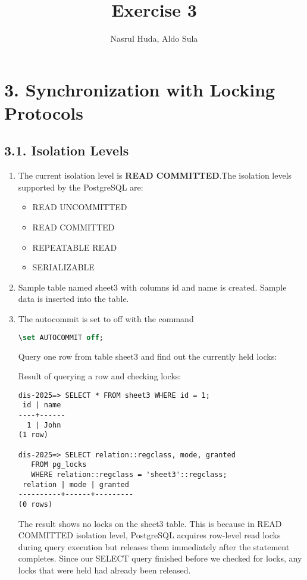 \documentclass{article}
\begin{document}
    \title{Exercise 3}
    \author{Nasrul Huda, Aldo Sula}
    \maketitle

    \section{3. Synchronization with Locking Protocols}
    \subsection{3.1. Isolation Levels}
    \begin{enumerate}[label=\alph*)]
        \item The current isolation level is \textbf{READ COMMITTED}.The isolation levels supported by the PostgreSQL are:
        \begin{itemize}
            \item READ UNCOMMITTED
            \item READ COMMITTED
            \item REPEATABLE READ
            \item SERIALIZABLE
        \end{itemize}

        \item Sample table named sheet3 with columns id and name is created. Sample data is inserted into the table.
        
        \item The autocommit is set to off with the command \begin{lstlisting}[language=sql]
            \set AUTOCOMMIT off;
        \end{lstlisting}

        Query one row from table sheet3 and find out the currently held locks: 
        
        Result of querying a row and checking locks:
        \begin{lstlisting}
dis-2025=> SELECT * FROM sheet3 WHERE id = 1;
 id | name 
----+------
  1 | John
(1 row)

dis-2025=> SELECT relation::regclass, mode, granted
   FROM pg_locks
   WHERE relation::regclass = 'sheet3'::regclass;
 relation | mode | granted 
----------+------+---------
(0 rows)
        \end{lstlisting}
        
        The result shows no locks on the sheet3 table. This is because in READ COMMITTED isolation level, PostgreSQL acquires row-level read locks during query execution but releases them immediately after the statement completes. Since our SELECT query finished before we checked for locks, any locks that were held had already been released.
        
    \end{enumerate}
    
    
\end{document}
